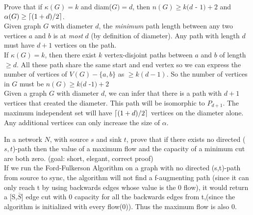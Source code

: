 \documentclass[12pt]{article}
\DeclarePairedDelimiter{\ceil}{\lceil}{\rceil}
\newenvironment{question}[2][Question]{\begin{trivlist}
\item[\hskip \labelsep {\bfseries #1}\hskip \labelsep {\bfseries #2.}]}{\end{trivlist}}
\begin{document}
\begin{question}{8}
Prove that if $\kappa(G) = k$ and diam($G) = d$, then $n(G) \geq k(d$ - $ 1) + 2$ and $\alpha(G) \geq \ceil[big]{(1 + d)/2}$.\\

Given graph $G$ with diameter $d$, the \textit{minimum} path length between any two vertices $a$ and $b$ is at \textit{most} $d$ (by definition of diameter). Any path with length $d$ must have $d+1$ vertices on the path.\\

If $\kappa(G) = k$, then there exist $k$ vertex-disjoint paths between $a$ and $b$ of length $\geq d$. All these path share the same start and end vertex so we can express the number of vertices of $V(G)-\{a,b\}$ as $\geq k(d-1)$. So the number of vertices in $G$ must be $n(G) \geq k(d$ -$1) +2$\\


Given a graph $G$ with diameter $d$, we can infer that there is a path with $d+1$ vertices that created the diameter.  This path will be isomorphic to $P_{d+1}$.  The maximum independent set will have $\ceil[big]{(1 + d)/2}$ vertices on the diameter alone.  Any additional vertices can only increase the size of $\alpha$.



\end{question}

\begin{question}{9}
In a network $N$, with source $s$ and sink $t$, prove that if there exists no directed ($s, t$)-path then the value of a maximum flow and the capacity of a minimum cut are both zero. (goal: short, elegant, correct proof) \\

If we run the Ford-Fulkerson Algorithm on a graph with no directed (s,t)-path from source to sync, the algorithm will not find a f-augmenting path (since it can only reach t by using backwards edges whose value is the 0 flow), it would return a [S,$\bar{S}$] edge cut with 0 capacity for all the backwards edges from t,(since the algorithm is initialized with every flow(0)). Thus the maximum flow is also 0.
\end{question}
\end{document}
